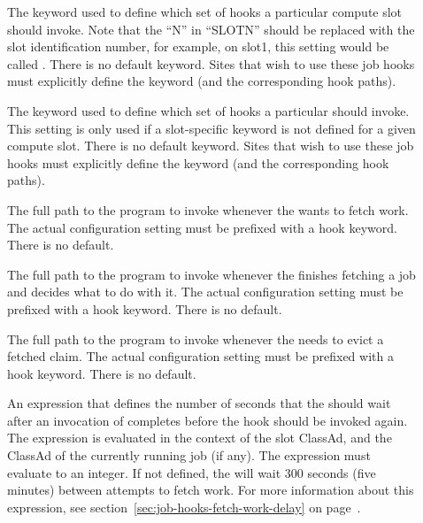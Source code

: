 \begin{description}

\item[]
\label{param:SlotNJobHookKeyword}
  The keyword used to define which set of hooks a particular
  compute slot should invoke.
  Note that the ``N'' in ``SLOTN'' should be replaced with the slot
  identification number, for example, on slot1, this setting would be
  called \MacroNI{[SLOT1\_JOB\_HOOK\_KEYWORD}.
  There is no default keyword.
  Sites that wish to use these job hooks must explicitly define the
  keyword (and the corresponding hook paths).

\item[]
\label{param:StartdJobHookKeyword}
  The keyword used to define which set of hooks a particular
   should invoke.
  This setting is only used if a slot-specific keyword is not defined
  for a given compute slot.
  There is no default keyword.
  Sites that wish to use these job hooks must explicitly define the
  keyword (and the corresponding hook paths).

\item[]
\label{param:HookFetchWork}
  The full path to the program to invoke whenever the 
  wants to fetch work.
  The actual configuration setting must be prefixed with a hook keyword.
  There is no default.

\item[]
\label{param:HookReplyClaim}
  The full path to the program to invoke whenever the 
  finishes fetching a job and decides what to do with it.
  The actual configuration setting must be prefixed with a hook keyword.
  There is no default.

\item[]
\label{param:HookEvictClaim}
  The full path to the program to invoke whenever the 
  needs to evict a fetched claim.
  The actual configuration setting must be prefixed with a hook keyword.
  There is no default.

\item[]
\label{param:FetchWorkDelay}
  An expression that defines the number of seconds that the
   should wait after an invocation of
   completes before the hook should be
  invoked again.
  The expression is evaluated in the context of the slot ClassAd, and
  the ClassAd of the currently running job (if any).
  The expression must evaluate to an integer.
  If not defined, the  will wait 300 seconds (five
  minutes) between attempts to fetch work.
  For more information about this expression, see
  section~\ref{sec:job-hooks-fetch-work-delay} on
  page~\pageref{sec:job-hooks-fetch-work-delay}.

\end{description}

